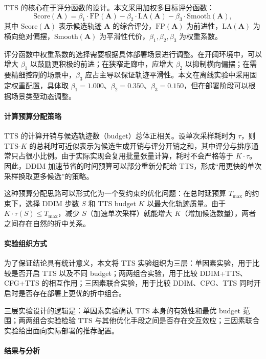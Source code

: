 TTS 的核心在于评分函数的设计。本文采用加权多目标评分函数：
\begin{equation}
\text{Score}(\mathbf{A}) = \beta_1 \cdot \text{FP}(\mathbf{A}) - \beta_2 \cdot \text{LA}(\mathbf{A}) - \beta_3 \cdot \text{Smooth}(\mathbf{A}),
\end{equation}
其中 $\text{Score}(\mathbf{A})$ 表示候选轨迹 $\mathbf{A}$ 的综合评分，$\text{FP}(\mathbf{A})$ 为前进性，$\text{LA}(\mathbf{A})$ 为横向绝对偏摆，$\text{Smooth}(\mathbf{A})$ 为平滑性代价，$\beta_1, \beta_2, \beta_3$ 为权重系数。

评分函数中权重系数的选择需要根据具体部署场景进行调整。在开阔环境中，可以增大 $\beta_1$ 以鼓励更积极的前进；在狭窄走廊中，应增大 $\beta_2$ 以抑制横向偏摆；在需要精细控制的场景中，$\beta_3$ 应占主导以保证轨迹平滑性。本文在离线实验中采用固定权重配置，具体取 $\beta_1=1.000$、$\beta_2=0.350$、$\beta_3=0.150$，但在部署阶段可以根据场景类型动态调整。

\paragraph*{计算预算分配策略}

TTS 的计算开销与候选轨迹数（budget）总体正相关。设单次采样耗时为 $\tau$，则 TTS-$K$ 的总耗时可近似表示为候选生成开销与评分开销之和，其中评分与排序通常只占很小比例。由于实际实现会复用批量张量计算，耗时不会严格等于 $K \cdot \tau$。因此，DDIM 加速节省的时间预算可以部分重新分配给 TTS，形成``用更快的单次采样换取更多候选''的策略。

这种预算分配思路可以形式化为一个受约束的优化问题：在总时延预算 $T_{\max}$ 的约束下，选择 DDIM 步数 $S$ 和 TTS budget $K$ 以最大化轨迹质量。由于 $K \cdot \tau(S) \leq T_{\max}$，减少 $S$（加速单次采样）就能增大 $K$（增加候选数量），两者之间存在自然的折中关系。

\paragraph*{实验组织方式}

为了保证结论具有统计意义，本文将 TTS 实验组织为三层：单因素实验，用于比较是否开启 TTS 以及不同 budget；两两组合实验，用于比较 DDIM+TTS、CFG+TTS 的相互作用；三因素联合实验，用于比较 DDIM、CFG、TTS 同时开启时是否存在部署上更优的折中组合。

三层实验设计的逻辑是：单因素实验确认 TTS 本身的有效性和最优 budget 范围；两两组合实验检验 TTS 与其他优化手段之间是否存在交互效应；三因素联合实验给出面向实际部署的推荐配置。

\paragraph*{结果与分析}

